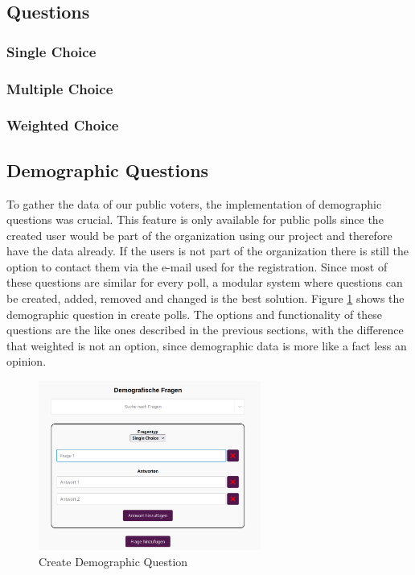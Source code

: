 \documentclass[a4paper,12pt]{report}
\begin{document}
\subsection{Questions}
\subsubsection{Single Choice}
\subsubsection{Multiple Choice}
\subsubsection{Weighted Choice}
\subsection{Demographic Questions}
To gather the data of our public voters, the implementation of demographic questions was crucial. This feature is only available for public polls since the created user would be part of the organization using our project and therefore have the data already. If the users is not part of the organization there is still the option to contact them via the e-mail used for the registration. Since most of these questions are similar for every poll, a modular system where questions can be created, added, removed and changed is the best solution. Figure \ref{fig:create_dem_que} shows the demographic question in create polls. The options and functionality of these questions are the like ones described in the previous sections, with the difference that weighted is not an option, since demographic data is more like a fact less an opinion.
\begin{figure}[h!]
	\centering
	\includegraphics[width=0.65\textwidth]{pics/demographic_question_create.jpg}
	\caption{Create Demographic Question}
	\label{fig:create_dem_que}
\end{figure}
\end{document}
